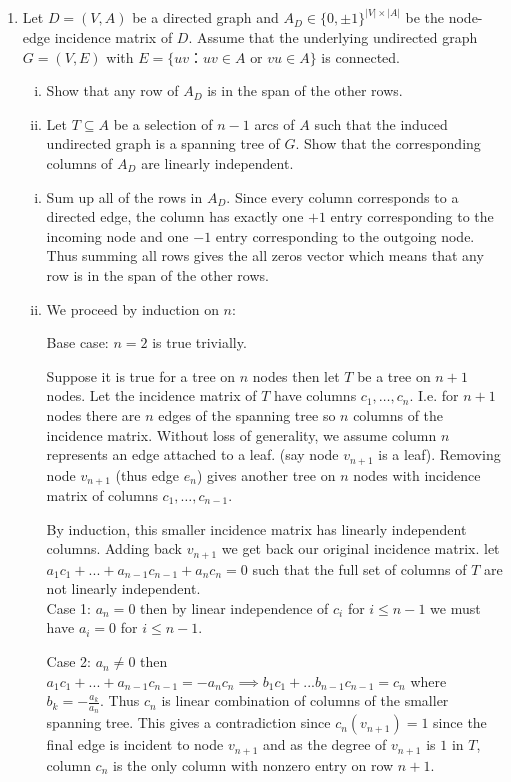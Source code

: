 \documentclass[11pt]{article}
\begin{document}
\begin{enumerate}[1)]
\item Let $D = (V,A)$  be a directed graph and $A_D ∈ \{0,\pm1\}^{|V| × |A|}$ be the node-edge incidence matrix of $D$. Assume that the underlying undirected graph $G = (V,E)$  with $E = \{ uv ： uv ∈A \text{ or } vu ∈ A\}$ is connected. 
  \begin{enumerate}[i)]
  \item Show that any row of $A_D$ is in the span of the other rows.
  \item Let $T ⊆ A$ be a selection of $n-1$ arcs of $A$ such that the induced undirected graph is a spanning tree of $G$. Show that the corresponding columns of $A_D$ are linearly independent.
  \end{enumerate}
  
  
  \begin{solution}
  
  \begin{enumerate}[i)]
  \item Sum up all of the rows in $A_D$. Since every column corresponds to a directed edge, the column has exactly one $+1$ entry corresponding to the incoming node and one $-1$ entry corresponding to the outgoing node. Thus summing all rows gives the all zeros vector which means that any row is in the span of the other rows. 
  
  \item We proceed by induction on $n$:

Base case: $n=2$ is true trivially. 

Suppose it is true for a tree on $n$ nodes then let $T$ be a tree on $n+1$ nodes. Let the incidence matrix of $T$ have columns $c_1, \hdots, c_{n}$. I.e. for $n+1$ nodes there are $n$ edges of the spanning tree so $n$ columns of the incidence matrix. 
Without loss of generality, we assume column $n$ represents an edge attached to a leaf. (say node $v_{n+1}$ is a leaf). Removing node $v_{n+1}$ (thus edge $e_n$) gives another tree on $n$ nodes with incidence matrix of columns $c_1, \hdots, c_{n-1}$. 

By induction, this smaller incidence matrix has linearly independent columns. Adding back $v_{n+1}$ we get back our original incidence matrix. let
$a_1c_1+...+a_{n−1}c_{n−1}+a_nc_n=0$ such that the full set of columns of $T$ are not linearly independent. \\
Case 1: $a_n=0$ then by linear independence of $c_i$ for $i≤n−1$ we must have $a_i=0$ for $i≤n−1$.

Case 2: $a_n\neq 0$ then
$a_1c_1+...+a_{n−1}c_{n−1}=−a_nc_n⟹b_1c_1+...b_{n−1}c_{n−1}=c_n$
where $b_k= - \frac{a_k}{a_n}$. Thus $c_n$ is linear combination of columns of the smaller spanning tree. This gives a contradiction since $c_n(v_{n+1})=1$ since the final edge is incident to node $v_{n+1}$ and as the degree of $v_{n+1}$ is $1$ in $T$, column $c_n$ is the only column with nonzero entry on row $n+1$. 
  

\end{enumerate}
\end{solution}
\end{enumerate}
\end{document}
